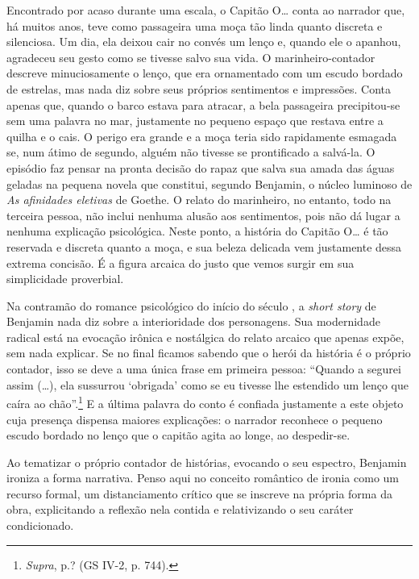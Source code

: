 Encontrado por acaso durante uma escala, o Capitão O\ldots{} conta ao
narrador que, há muitos anos, teve como passageira uma moça tão linda
quanto discreta e silenciosa. Um dia, ela deixou cair no convés um lenço
e, quando ele o apanhou, agradeceu seu gesto como se tivesse salvo sua
vida. O marinheiro-contador descreve minuciosamente o lenço, que era
ornamentado com um escudo bordado de estrelas, mas nada diz sobre seus
próprios sentimentos e impressões. Conta apenas que, quando o barco
estava para atracar, a bela passageira precipitou-se sem uma palavra no
mar, justamente no pequeno espaço que restava entre a quilha e o cais. O
perigo era grande e a moça teria sido rapidamente esmagada se, num átimo
de segundo, alguém não tivesse se prontificado a salvá-la. O episódio
faz pensar na pronta decisão do rapaz que salva sua amada das águas
geladas na pequena novela que constitui, segundo Benjamin, o núcleo
luminoso de \emph{As afinidades eletivas} de Goethe. O relato do
marinheiro, no entanto, todo na terceira pessoa, não inclui nenhuma
alusão aos sentimentos, pois não dá lugar a nenhuma explicação
psicológica. Neste ponto, a história do Capitão O\ldots{} é tão reservada e
discreta quanto a moça, e sua beleza delicada vem justamente dessa
extrema concisão. É a figura arcaica do justo que vemos surgir em sua
simplicidade proverbial.

Na contramão do romance psicológico do início do século , a
\emph{short story} de Benjamin nada diz sobre a interioridade dos
personagens. Sua modernidade radical está na evocação irônica e
nostálgica do relato arcaico que apenas expõe, sem nada explicar. Se no
final ficamos sabendo que o herói da história é o próprio contador, isso
se deve a uma única frase em primeira pessoa: ``Quando a segurei assim
(\ldots{}), ela sussurrou `obrigada' como se eu tivesse lhe estendido um
lenço que caíra ao chão''.\footnote{\emph{Supra}, p.? (GS IV-2, p. 744).}
E a última palavra do conto é confiada justamente a este objeto cuja
presença dispensa maiores explicações: o narrador reconhece o pequeno
escudo bordado no lenço que o capitão agita ao longe, ao despedir-se.

Ao tematizar o próprio contador de histórias, evocando o seu espectro,
Benjamin ironiza a forma narrativa. Penso aqui no conceito romântico de
ironia como um recurso formal, um distanciamento crítico que se inscreve
na própria forma da obra, explicitando a reflexão nela contida e
relativizando o seu caráter condicionado.

